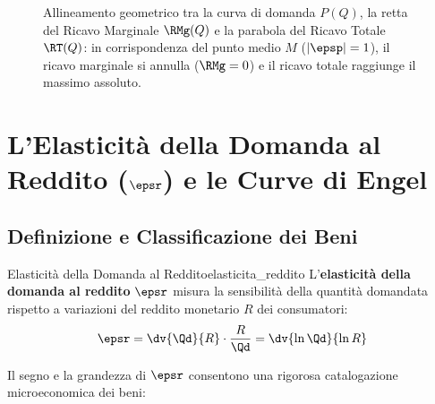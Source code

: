 \begin{figure}[htbp]
\caption{Allineamento geometrico tra la curva di domanda $P(Q)$, la retta del Ricavo Marginale $\RMg(Q)$ e la parabola del Ricavo Totale $\RT(Q)$: in corrispondenza del punto medio $M$ ($|\epsp|=1$), il ricavo marginale si annulla ($\RMg=0$) e il ricavo totale raggiunge il massimo assoluto.}
\label{fig:elasticita_ricavo_totale}
\end{figure}

\section{L'Elasticità della Domanda al Reddito ($\epsr$) e le Curve di Engel}

\subsection{Definizione e Classificazione dei Beni}

\begin{definizione}{Elasticità della Domanda al Reddito}{elasticita_reddito}
L'\textbf{elasticità della domanda al reddito} $\epsr$ misura la sensibilità della quantità domandata rispetto a variazioni del reddito monetario $R$ dei consumatori:
\begin{equation}
    \epsr = \dv{\Qd}{R} \cdot \frac{R}{\Qd} = \dv{\ln \Qd}{\ln R}
\end{equation}
\end{definizione}

Il segno e la grandezza di $\epsr$ consentono una rigorosa catalogazione microeconomica dei beni:

